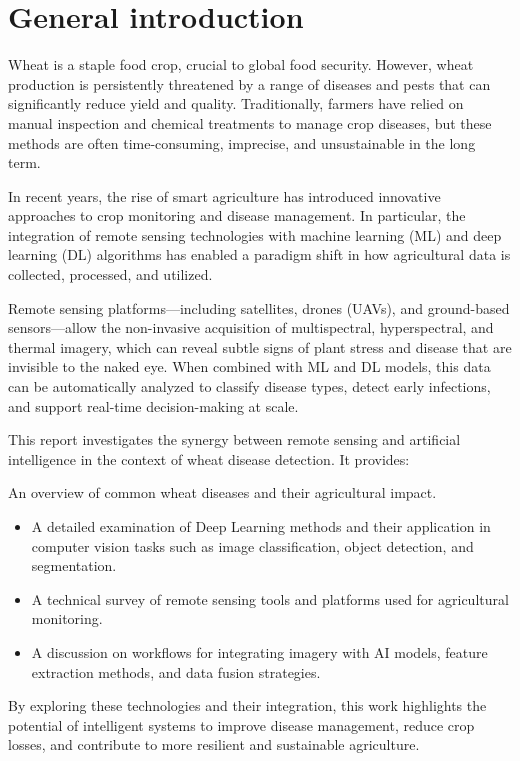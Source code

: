 \chapter*{General introduction}
\label{chap.intro}

Wheat is a staple food crop, crucial to global food security. However, wheat production is persistently threatened by a range of diseases and pests that can significantly reduce yield and quality. Traditionally, farmers have relied on manual inspection and chemical treatments to manage crop diseases, but these methods are often time-consuming, imprecise, and unsustainable in the long term.

In recent years, the rise of smart agriculture has introduced innovative approaches to crop monitoring and disease management. In particular, the integration of remote sensing technologies with machine learning (ML) and deep learning (DL) algorithms has enabled a paradigm shift in how agricultural data is collected, processed, and utilized.

Remote sensing platforms—including satellites, drones (UAVs), and ground-based sensors—allow the non-invasive acquisition of multispectral, hyperspectral, and thermal imagery, which can reveal subtle signs of plant stress and disease that are invisible to the naked eye. When combined with ML and DL models, this data can be automatically analyzed to classify disease types, detect early infections, and support real-time decision-making at scale.

This report investigates the synergy between remote sensing and artificial intelligence in the context of wheat disease detection. It provides:

An overview of common wheat diseases and their agricultural impact.

\begin{itemize}
    \item A detailed examination of Deep Learning methods and their application in computer vision tasks such as image classification, object detection, and segmentation.
    \item A technical survey of remote sensing tools and platforms used for agricultural monitoring.
    \item A discussion on workflows for integrating imagery with AI models, feature extraction methods, and data fusion strategies.
  \end{itemize}
  
By exploring these technologies and their integration, this work highlights the potential of intelligent systems to improve disease management, reduce crop losses, and contribute to more resilient and sustainable agriculture.